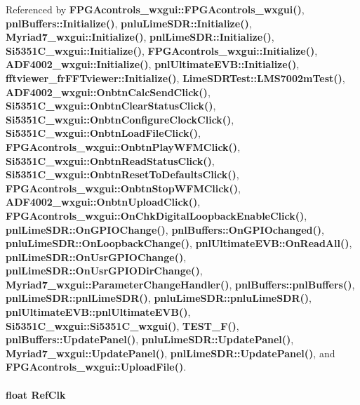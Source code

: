 Referenced by {\bf F\+P\+G\+Acontrols\+\_\+wxgui\+::\+F\+P\+G\+Acontrols\+\_\+wxgui()}, {\bf pnl\+Buffers\+::\+Initialize()}, {\bf pnlu\+Lime\+S\+D\+R\+::\+Initialize()}, {\bf Myriad7\+\_\+wxgui\+::\+Initialize()}, {\bf pnl\+Lime\+S\+D\+R\+::\+Initialize()}, {\bf Si5351\+C\+\_\+wxgui\+::\+Initialize()}, {\bf F\+P\+G\+Acontrols\+\_\+wxgui\+::\+Initialize()}, {\bf A\+D\+F4002\+\_\+wxgui\+::\+Initialize()}, {\bf pnl\+Ultimate\+E\+V\+B\+::\+Initialize()}, {\bf fftviewer\+\_\+fr\+F\+F\+Tviewer\+::\+Initialize()}, {\bf Lime\+S\+D\+R\+Test\+::\+L\+M\+S7002m\+Test()}, {\bf A\+D\+F4002\+\_\+wxgui\+::\+Onbtn\+Calc\+Send\+Click()}, {\bf Si5351\+C\+\_\+wxgui\+::\+Onbtn\+Clear\+Status\+Click()}, {\bf Si5351\+C\+\_\+wxgui\+::\+Onbtn\+Configure\+Clock\+Click()}, {\bf Si5351\+C\+\_\+wxgui\+::\+Onbtn\+Load\+File\+Click()}, {\bf F\+P\+G\+Acontrols\+\_\+wxgui\+::\+Onbtn\+Play\+W\+F\+M\+Click()}, {\bf Si5351\+C\+\_\+wxgui\+::\+Onbtn\+Read\+Status\+Click()}, {\bf Si5351\+C\+\_\+wxgui\+::\+Onbtn\+Reset\+To\+Defaults\+Click()}, {\bf F\+P\+G\+Acontrols\+\_\+wxgui\+::\+Onbtn\+Stop\+W\+F\+M\+Click()}, {\bf A\+D\+F4002\+\_\+wxgui\+::\+Onbtn\+Upload\+Click()}, {\bf F\+P\+G\+Acontrols\+\_\+wxgui\+::\+On\+Chk\+Digital\+Loopback\+Enable\+Click()}, {\bf pnl\+Lime\+S\+D\+R\+::\+On\+G\+P\+I\+O\+Change()}, {\bf pnl\+Buffers\+::\+On\+G\+P\+I\+Ochanged()}, {\bf pnlu\+Lime\+S\+D\+R\+::\+On\+Loopback\+Change()}, {\bf pnl\+Ultimate\+E\+V\+B\+::\+On\+Read\+All()}, {\bf pnl\+Lime\+S\+D\+R\+::\+On\+Usr\+G\+P\+I\+O\+Change()}, {\bf pnl\+Lime\+S\+D\+R\+::\+On\+Usr\+G\+P\+I\+O\+Dir\+Change()}, {\bf Myriad7\+\_\+wxgui\+::\+Parameter\+Change\+Handler()}, {\bf pnl\+Buffers\+::pnl\+Buffers()}, {\bf pnl\+Lime\+S\+D\+R\+::pnl\+Lime\+S\+D\+R()}, {\bf pnlu\+Lime\+S\+D\+R\+::pnlu\+Lime\+S\+D\+R()}, {\bf pnl\+Ultimate\+E\+V\+B\+::pnl\+Ultimate\+E\+V\+B()}, {\bf Si5351\+C\+\_\+wxgui\+::\+Si5351\+C\+\_\+wxgui()}, {\bf T\+E\+S\+T\+\_\+\+F()}, {\bf pnl\+Buffers\+::\+Update\+Panel()}, {\bf pnlu\+Lime\+S\+D\+R\+::\+Update\+Panel()}, {\bf Myriad7\+\_\+wxgui\+::\+Update\+Panel()}, {\bf pnl\+Lime\+S\+D\+R\+::\+Update\+Panel()}, and {\bf F\+P\+G\+Acontrols\+\_\+wxgui\+::\+Upload\+File()}.

\paragraph[{Ref\+Clk}]{\setlength{\rightskip}{0pt plus 5cm}float Ref\+Clk}\label{mcu__program_2host__src_2main_8cpp_a163eabd7296e51e8ba07ab89686c406c}


